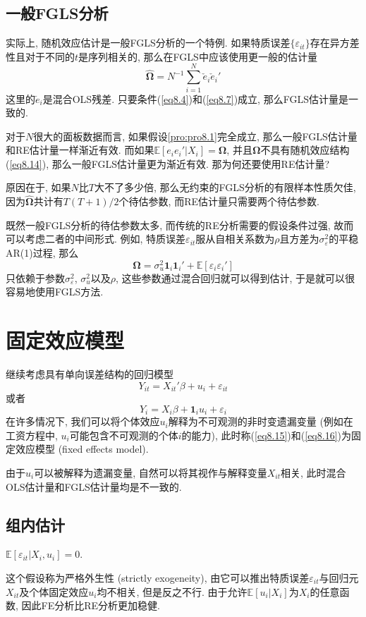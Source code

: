 \documentclass[cn, 12pt, math=mtpro2, bibstyle=apa, blue, twocol]{elegantbook}
\newcommand{\E}{\mathbb{E}}
\newcommand{\BO}{\mathbold{\Omega}}
\begin{document}
\subsection{一般FGLS分析}
实际上, 随机效应估计是一般FGLS分析的一个特例. 如果特质误差$\{\varepsilon_{it}\}$存在异方差性且对于不同的$t$是序列相关的, 那么在FGLS中应该使用更一般的估计量
$$\hat{\BO}=N^{-1}\sum_{i=1}^{N}\check{e}_{i}\check{e}_i'$$
这里的$\check{e}_i$是混合OLS残差. 只要条件(\ref{eq8.4})和(\ref{eq8.7})成立, 那么FGLS估计量是一致的.

对于$N$很大的面板数据而言, 如果假设\ref{pro:pro8.1}完全成立, 那么一般FGLS估计量和RE估计量一样渐近有效. 而如果$\E[e_ie_i'|X_i]=\BO$, 并且$\BO$不具有随机效应结构(\ref{eq8.14}), 那么一般FGLS估计量更为渐近有效. 那为何还要使用RE估计量?

原因在于, 如果$N$比$T$大不了多少倍, 那么无约束的FGLS分析的有限样本性质欠佳, 因为$\hat{\BO}$共计有$T(T+1)/2$个待估参数, 而RE估计量只需要两个待估参数.

既然一般FGLS分析的待估参数太多, 而传统的RE分析需要的假设条件过强, 故而可以考虑二者的中间形式. 例如, 特质误差$\varepsilon_{it}$服从自相关系数为$\rho$且方差为$\sigma_\varepsilon^2$的平稳AR(1)过程, 那么
$$\BO=\sigma^2_u\mathbf{1}_i\mathbf{1}_i'+\E[\varepsilon_i\varepsilon_i']$$
只依赖于参数$\sigma_\varepsilon^2$, $\sigma_u^2$以及$\rho$, 这些参数通过混合回归就可以得到估计, 于是就可以很容易地使用FGLS方法.

\section{固定效应模型}
继续考虑具有单向误差结构的回归模型
\begin{equation}\label{eq8.15}
  Y_{it}=X_{it}'\beta+u_i+\varepsilon_{it}
\end{equation}
或者
\begin{equation}\label{eq8.16}
  Y_i=X_i\beta+\mathbf{1}_iu_i+\varepsilon_i
\end{equation}
 在许多情况下, 我们可以将个体效应$u_i$解释为不可观测的非时变遗漏变量 (例如在工资方程中, $u_i$可能包含不可观测的个体$i$的能力), 此时称(\ref{eq8.15})和(\ref{eq8.16})为固定效应模型 (fixed effects model).

 由于$u_i$可以被解释为遗漏变量, 自然可以将其视作与解释变量$X_{it}$相关, 此时混合OLS估计量和FGLS估计量均是不一致的.
\subsection{组内估计}
\begin{proposition}\label{pro:pro8.2}
$\E[\varepsilon_{it}|X_i, u_i]=0$.
\end{proposition}
这个假设称为严格外生性 (strictly exogeneity), 由它可以推出特质误差$\varepsilon_{it}$与回归元$X_{it}$及个体固定效应$u_i$均不相关, 但是反之不行.  由于允许$\E[u_i|X_i]$为$X_i$的任意函数, 因此FE分析比RE分析更加稳健.
\end{document}

